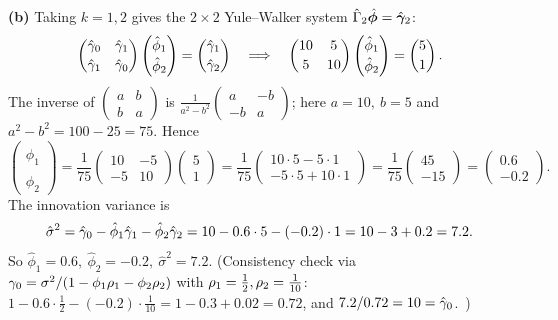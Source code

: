\documentclass[11pt]{article}
\begin{document}
\textbf{(b)} Taking $k=1,2$ gives the $2\times2$ Yule--Walker system
$\hat\Gamma_2\hat{\boldsymbol\phi}=\hat{\boldsymbol{\gamma}}_2$:
\[
\begin{pmatrix}\hat{\gamma}_0 & \hat{\gamma}_1\\[2pt] \hat{\gamma}_1 & \hat{\gamma}_0\end{pmatrix}
\begin{pmatrix}\hat\phi_1\\[2pt] \hat\phi_2\end{pmatrix}
=\begin{pmatrix}\hat{\gamma}_1\\[2pt] \hat{\gamma}_2\end{pmatrix}
\quad\Longrightarrow\quad
\begin{pmatrix}10 & 5\\[2pt] 5 & 10\end{pmatrix}
\begin{pmatrix}\hat\phi_1\\[2pt] \hat\phi_2\end{pmatrix}
=\begin{pmatrix}5\\[2pt] 1\end{pmatrix}.
\]
The inverse of $\left(\begin{smallmatrix}a&b\\ b&a\end{smallmatrix}\right)$ is $\tfrac{1}{a^{2}-b^{2}}\left(\begin{smallmatrix}a&-b\\ -b&a\end{smallmatrix}\right)$; here $a=10,\ b=5$ and $a^{2}-b^{2}=100-25=75$. Hence
\[
\begin{pmatrix}\hat\phi_1\\ \hat\phi_2\end{pmatrix}
=\frac{1}{75}\begin{pmatrix}10 & -5\\ -5 & 10\end{pmatrix}\begin{pmatrix}5\\ 1\end{pmatrix}
=\frac{1}{75}\begin{pmatrix}10\cdot5-5\cdot1\\ -5\cdot5+10\cdot1\end{pmatrix}
=\frac{1}{75}\begin{pmatrix}45\\ -15\end{pmatrix}
=\begin{pmatrix}0.6\\ -0.2\end{pmatrix}.
\]
The innovation variance is
\[
\hat\sigma^{2}=\hat{\gamma}_0-\hat\phi_1\hat{\gamma}_1-\hat\phi_2\hat{\gamma}_2
=10-0.6\cdot5-(-0.2)\cdot1=10-3+0.2=7.2 .
\]
So $\boxed{\hat\phi_1=0.6,\ \hat\phi_2=-0.2,\ \hat\sigma^{2}=7.2.}$
(Consistency check via $\gamma_0=\sigma^{2}/(1-\phi_1\rho_1-\phi_2\rho_2)$ with $\rho_1=\tfrac12,\rho_2=\tfrac{1}{10}$: $1-0.6\cdot\tfrac12-(-0.2)\cdot\tfrac1{10}=1-0.3+0.02=0.72$, and $7.2/0.72=10=\hat{\gamma}_0$.\ \checkmark)
\end{document}
